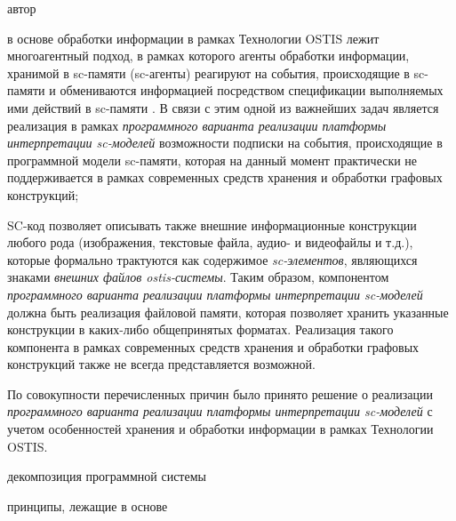 \begin{SCn}
\begin{scnsubstruct}
\begin{scnrelfromlist}{автор}
{\begin{scnitemize}
                \item в основе обработки информации в рамках Технологии OSTIS лежит многоагентный подход, в рамках которого агенты обработки информации, хранимой в sc-памяти (sc-агенты) реагируют на события, происходящие в sc-памяти и обмениваются информацией посредством спецификации выполняемых ими действий в sc-памяти \cite{Shunkevich2018}. В связи с этим одной из важнейших задач является реализация в рамках \textit{программного варианта реализации платформы интерпретации sc-моделей} возможности подписки на события, происходящие в программной модели sc-памяти, которая на данный момент практически не поддерживается в рамках современных средств хранения и обработки графовых конструкций;
                \item SC-код позволяет описывать также внешние информационные конструкции любого рода (изображения, текстовые файла, аудио- и видеофайлы и т.д.), которые формально трактуются как содержимое \textit{sc-элементов}, являющихся знаками \textit{внешних файлов ostis-системы}. Таким образом, компонентом \textit{программного варианта реализации платформы интерпретации sc-моделей} должна быть реализация файловой памяти, которая позволяет хранить указанные конструкции в каких-либо общепринятых форматах. Реализация такого компонента в рамках современных средств хранения и обработки графовых конструкций также не всегда представляется возможной.
            \end{scnitemize}
            По совокупности перечисленных причин было принято решение о реализации \textit{программного варианта реализации платформы интерпретации sc-моделей}  с учетом особенностей хранения и обработки информации в рамках Технологии OSTIS.}
        \begin{scnrelfromset}{декомпозиция программной системы}
        \end{scnrelfromset}
        \begin{scnrelfromlist}{принципы, лежащие в основе}

\end{scnrelfromlist}
\end{scnrelfromlist}
\end{scnsubstruct}
\end{SCn}
